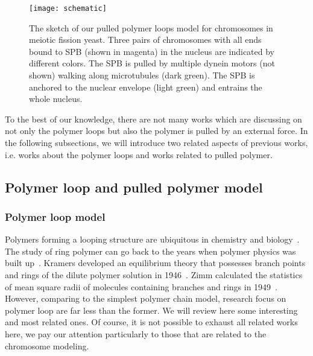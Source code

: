 \begin{figure}[htpb]
    \centering
    \texttt{[image: schematic]}
    \caption{The sketch of our pulled polymer loops model for chromosomes in meiotic fission yeast. Three pairs of chromosomes with all ends bound to SPB (shown in magenta) in the nucleus are indicated by different colors.  The SPB is pulled by multiple dynein motors (not shown) walking along microtubules (dark green). The SPB is anchored to the nuclear envelope (light green) and entrains the whole nucleus.}
    \label{fig:schematic}
\end{figure}

To the best of our knowledge, there are not many works which are discussing on not only the polymer loops but also the polymer is pulled by an external force. In the following subsections, we will introduce two related aspects of previous works, i.e. works about the polymer loops and works related to pulled polymer. 

\subsection{Polymer loop and pulled polymer model}
\label{sub:polymer_loop_and_pulled_polymer_model}

\subsubsection{Polymer loop model}
\label{ssub:Polymer_loop_model}

Polymers forming a looping structure are ubiquitous in chemistry and biology~\cite{Halverson2014,Richter2015}. The study of ring polymer can go back to the years when polymer physics was built up~\cite{Kramers1946,Zimm1949}. Kramers developed an equilibrium theory that possesses branch points and rings of the dilute polymer solution in 1946~\cite{Kramers1946}. Zimm calculated the statistics of mean square radii of molecules containing branches and rings in 1949~\cite{Zimm1949}. However, comparing to the simplest polymer chain model, research focus on polymer loop are far less than the former. We will review here some interesting and most related ones. Of course, it is not possible to exhaust all related works here, we pay our attention particularly to those that are related to the chromosome modeling.

